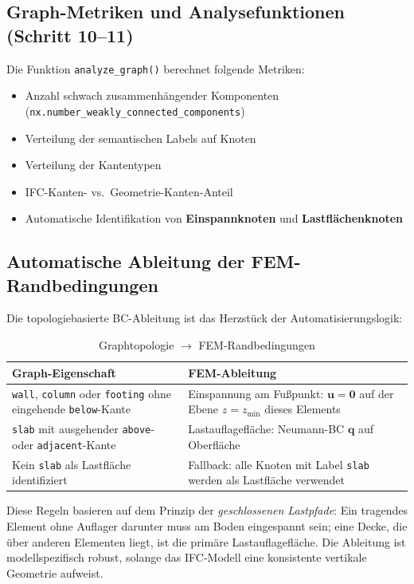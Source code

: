 \documentclass[a4paper,11pt]{article}
\begin{document}
\subsection{Graph-Metriken und Analysefunktionen (Schritt 10--11)}

Die Funktion \texttt{analyze\_graph()} berechnet folgende Metriken:

\begin{itemize}[noitemsep]
  \item Anzahl schwach zusammenhängender Komponenten (\texttt{nx.number\_weakly\_connected\_components})
  \item Verteilung der semantischen Labels auf Knoten
  \item Verteilung der Kantentypen
  \item IFC-Kanten- vs.\ Geometrie-Kanten-Anteil
  \item Automatische Identifikation von \textbf{Einspannknoten} und \textbf{Lastflächenknoten}
\end{itemize}

\subsection{Automatische Ableitung der FEM-Randbedingungen}

Die topologiebasierte BC-Ableitung ist das Herzstück der Automatisierungslogik:

\begin{table}[H]
\centering
\caption{Graphtopologie $\to$ FEM-Randbedingungen}
\begin{tabular}{p{7cm}p{7cm}}
\toprule
\textbf{Graph-Eigenschaft} & \textbf{FEM-Ableitung} \\
\midrule
\texttt{wall}, \texttt{column} oder \texttt{footing} ohne eingehende \texttt{below}-Kante & Einspannung am Fußpunkt: $\mathbf{u} = \mathbf{0}$ auf der Ebene $z = z_\text{min}$ dieses Elements \\
\texttt{slab} mit ausgehender \texttt{above}- oder \texttt{adjacent}-Kante & Lastauflagefläche: Neumann-BC $\mathbf{q}$ auf Oberfläche \\
Kein \texttt{slab} als Lastfläche identifiziert & Fallback: alle Knoten mit Label \texttt{slab} werden als Lastfläche verwendet \\
\bottomrule
\end{tabular}
\end{table}

Diese Regeln basieren auf dem Prinzip der \textit{geschlossenen Lastpfade}: Ein tragendes Element ohne Auflager darunter muss am Boden eingespannt sein; eine Decke, die über anderen Elementen liegt, ist die primäre Lastauflagefläche. Die Ableitung ist modellspezifisch robust, solange das IFC-Modell eine konsistente vertikale Geometrie aufweist.
\end{document}
